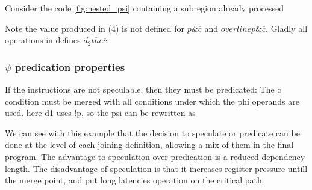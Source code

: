 Consider the code \ref{fig:nested_psi}  containing a subregion already processed

Note the value produced in (4) is not defined for $p \& \overline{c}$ and $overline{p} \& \overline{c}$. Gladly all operations in defines $d_2 the \overline{c}$.

\subsubsection{$\psi$ predication properties}

If the instructions are not speculable, then they must be predicated:
The c condition must be merged with all conditions under which the phi operands are used. here d1 uses !p, so the psi can be rewritten as

We can see with this example that the decision to speculate or predicate can be done at the level of each joining definition, allowing a mix of them in the final program. The advantage to speculation over predication is a reduced dependency length. The disadvantage of speculation is that it increases register pressure untill the merge point, and put long latencies operation on the critical path.
 
